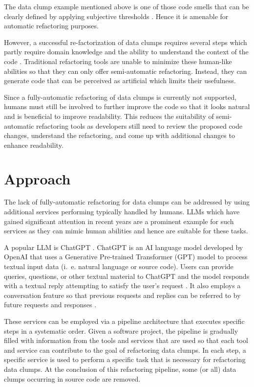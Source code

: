 The data clump example mentioned above is one of those code smells that can be clearly defined by applying subjective thresholds \cite{zhangImprovingPrecisionFowler2008}. Hence it is amenable for automatic refactoring purposes. 


However, a successful re-factorization of data clumps requires several steps which partly require domain knowledge and the ability to understand the context of the code \cite{martin2009clean}. Traditional refactoring tools are unable to minimize these human-like abilities so that they can only offer semi-automatic refactoring.   Instead, they can generate code that can be  perceived as artificial which limits their usefulness. 

Since a fully-automatic refactoring of data clumps is currently not supported, humans must still be involved to further improve the code so that it looks natural and is beneficial to improve readability. This reduces the suitability of semi-automatic refactoring tools as developers still need to review the proposed code changes, understand the refactoring, and come up with additional changes to enhance readability. 



\section{Approach}

The lack of fully-automatic refactoring for data clumps can be addressed by using additional 
  services performing typically handled by humans.  \acp{LLM} which have gained significant attention in recent years are a prominent example for such services as they can mimic human abilities and hence are suitable for these tasks.
  
  A popular \ac{LLM} is ChatGPT \cite{ChatGPT_url}. ChatGPT is an AI language model developed by OpenAI that uses a Generative Pre-trained Transformer (GPT) model to process textual input data (i.~e. natural language or source code). Users can provide queries, questions, or other textual material to ChatGPT and the model responds with a textual reply attempting to satisfy the user's request \cite{yetistirenEvaluatingCodeQuality2023}. It also employs a conversation feature so that previous requests and replies can be referred to by future requests and responses \cite{sobania2023analysis}.

These services can be employed via a pipeline architecture that executes specific steps in a systematic order.  Given a software project, the pipeline is gradually filled with information from the tools and services that are used so that each tool and service can contribute to the goal of refactoring data clumps.  In each step, a specific service is used to perform a specific task that is necessary for refactoring data clumps. At the conclusion of this refactoring pipeline, some (or all) data clumps occurring in source code are removed.  




